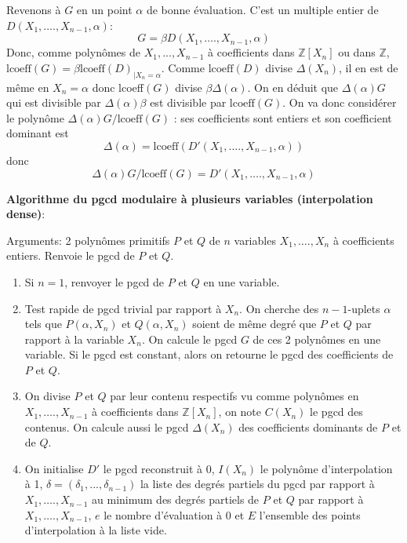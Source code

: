 \documentclass[a4paper,11pt]{book}
\begin{document}
\begin{giacjshere}
Revenons à $G$ en un point $\alpha$ de bonne évaluation. C'est un multiple
entier de $D ( X_1, \ldots ., X_{n - 1}, \alpha )$:
\[ G = \beta D ( X_1, \ldots ., X_{n - 1}, \alpha ) \]
Donc, comme polynômes de $X_1,...,X_{n-1}$ à coefficients dans 
$\mathbb{Z}[X_n]$ ou dans $\mathbb{Z}$,
$\mbox{lcoeff} ( G ) = \beta \mbox{lcoeff} ( D )_{| X_n = \alpha}$. Comme
$\mbox{lcoeff} ( D )$ divise $\Delta ( X_n )$, il en est de même en $X_n =
\alpha$ donc lcoeff$(G)$ divise $\beta \Delta(\alpha)$. 
On en déduit que $ \Delta ( \alpha) G$ qui 
est divisible par $ \Delta (\alpha) \beta$ est
divisible par $\mbox{lcoeff} ( G )$. On va donc considérer le polynôme
$ \Delta (\alpha) G  / \mbox{lcoeff} ( G )$ :
ses coefficients sont entiers et son coefficient dominant est  
$$\Delta ( \alpha) = \mbox{lcoeff}(D'( X_1, \ldots ., X_{n - 1}, \alpha ))$$
donc
\[ \Delta (\alpha) G  / \mbox{lcoeff} ( G )=
D'( X_1, \ldots ., X_{n - 1}, \alpha )\]

{\bf{Algorithme du pgcd modulaire à plusieurs variables (interpolation
dense)}}:

Arguments: 2 polynômes primitifs $P$ et $Q$ de $n$ variables $X_1, \ldots .,
X_n$ à coefficients entiers. Renvoie le pgcd de $P$ et $Q$.
\begin{enumerate}
  \item Si $n = 1$, renvoyer le pgcd de $P$ et $Q$ en une variable.
  
  \item Test rapide de pgcd trivial par rapport à $X_n$. On cherche des $n -
  1$-uplets $\alpha$ tels que $P ( \alpha, X_n )$ et $Q ( \alpha, X_n )$
  soient de même degré que $P$ et $Q$ par rapport à la variable $X_n$. On
  calcule le pgcd $G$ de ces 2 polynômes en une variable. Si le pgcd est
  constant, alors on retourne le pgcd des coefficients de $P$ et $Q$.
  
  \item On divise $P$ et $Q$ par leur contenu respectifs vu comme polynômes en
  $X_1, \ldots ., X_{n - 1}$ à coefficients dans $\mathbb{Z} [ X_n ]$, on note
  $C ( X_n )$ le pgcd des contenus. On calcule aussi le pgcd $\Delta ( X_n )$
  des coefficients dominants de $P$ et de $Q$.
  
  \item On initialise $D'$ le pgcd reconstruit à 0, $I ( X_n )$ le polynôme
  d'interpolation à 1, $\delta=(\delta_1,...,\delta_{n-1})$ 
  la liste des degrés partiels du pgcd par
  rapport à $X_1, \ldots ., X_{n - 1}$ au minimum des degrés partiels de $P$
  et $Q$ par rapport à $X_1, \ldots ., X_{n - 1}$, $e$ le nombre d'évaluation
  à 0 et $E$ l'ensemble des points d'interpolation à la liste vide.
  

\end{enumerate}
\end{giacjshere}
\end{document}
